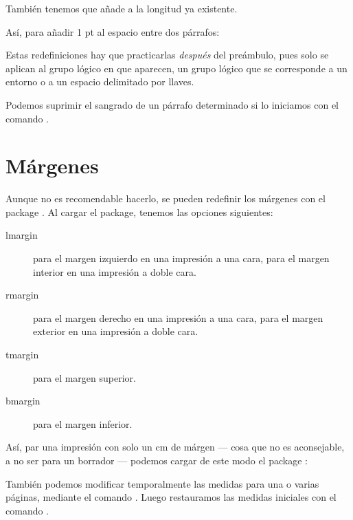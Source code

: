 \begin{latexcode}
\setlength{\parindent}{3ex}
\end{latexcode}

También tenemos  que añade  a la longitud ya existente.

Así, para añadir 1 pt al espacio entre dos párrafos:

\begin{latexcode}
\addtolength{\parskip}{1pt}
\end{latexcode}

Estas redefiniciones hay que practicarlas \emph{después} del preámbulo, pues solo se aplican al grupo lógico en que aparecen, un grupo lógico que se corresponde a un entorno o a un espacio delimitado por llaves.

\begin{plusloins}
Podemos suprimir el sangrado de un párrafo determinado si lo iniciamos con el comando .
\end{plusloins}

\section{Márgenes}

Aunque no es recomendable hacerlo, se pueden redefinir los márgenes con el package . Al cargar el package, tenemos las opciones siguientes:
\begin{description}
\item[lmargin]para el margen izquierdo en una impresión a una cara, para el margen interior en una impresión a doble cara.
\item[rmargin]para el margen derecho en una impresión a una cara, para el margen exterior en una impresión a doble cara.
\item[tmargin]para el margen superior.
\item[bmargin]para el margen inferior.
\end{description}

Así, par una impresión con solo un cm de márgen --- cosa que no es aconsejable, a no ser para un borrador --- podemos cargar de este modo el package :

\begin{latexcode}
\usepackage[lmargin=1cm,rmargin=1cm,tmargin=1cm,bmargin=1cm]{geometry}
\end{latexcode}

También podemos modificar temporalmente las medidas para una o varias páginas, mediante el comando . Luego restauramos las medidas iniciales con el comando .

